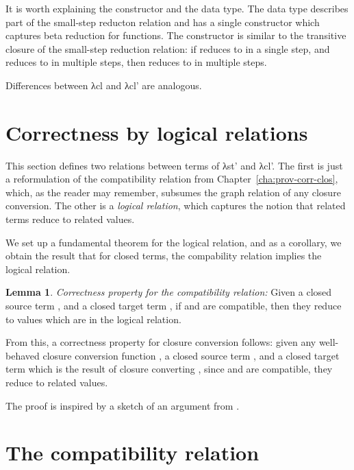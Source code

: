 \documentclass[bsc,frontabs,oneside,singlespacing,parskip,deptreport]{infthesis}
\theoremstyle{definition}
\theoremstyle{lemma}
\newtheorem*{lemma}{Lemma}
\begin{document}

It is worth explaining the  constructor and the 
data type. The  data type describes part of the small-step
reducton relation and has a single constructor which captures beta
reduction for functions. The  constructor is similar to the
transitive closure of the small-step reduction relation: if 
reduces to  in a single step, and  reduces to  in
multiple steps, then  reduces to  in multiple steps.

Differences between λcl and λcl' are analogous.

\section{Correctness by logical relations}
\label{sec:corr-logic-relat}

This section defines two relations between terms of λst' and λcl'. The
first is just a reformulation of the compatibility relation from
Chapter~\ref{cha:prov-corr-clos}, which, as the reader may remember,
subsumes the graph relation of any closure conversion. The other is a
\textit{logical relation}, which captures the notion that related
terms reduce to related values.

We set up a fundamental theorem for the logical relation, and as a
corollary, we obtain the result that for closed terms, the compability
relation implies the logical relation.

\begin{lemma}
  \label{sec:corr-logic-relat-1}
  \emph{Correctness property for the compatibility relation:} Given a
  closed source term , and a closed target term , if
   and  are compatible, then they reduce to values which
  are in the logical relation.
\end{lemma}

From this, a correctness property for closure conversion follows:
given any well-behaved closure conversion function , a closed
source term , and a closed target term  which is the
result of closure converting , since  and  are
compatible, they reduce to related values.

The proof is inspired by a sketch of an argument from
\cite{DBLP:conf/popl/MinamideMH96}.

\section{The compatibility relation}
\label{sec:lr-compat-rel}
\end{document}
